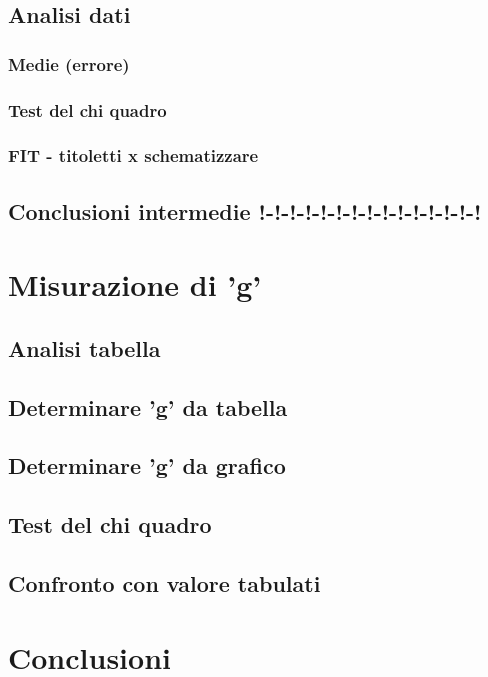 \documentclass[11pt, twoside, a4paper]{article}
\begin{document}
	\subsection{Analisi dati}
		\subsubsection{Medie (errore)}
		
		\subsubsection{Test del chi quadro}
		
		\subsubsection{FIT - titoletti x schematizzare}
		
	\subsection{Conclusioni intermedie !-!-!-!-!-!-!-!-!-!-!-!-!-!-!}
	
\newpage
\section{Misurazione di 'g'}
%
	\subsection{Analisi tabella}
	
	\subsection{Determinare 'g' da tabella}
	
	\subsection{Determinare 'g' da grafico}
	
	\subsection{Test del chi quadro}
	
	\subsection{Confronto con valore tabulati}
	

\newpage
\section{Conclusioni}

\end{document}
